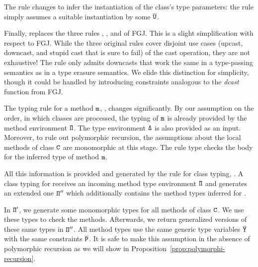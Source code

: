 The rule  changes to infer the
instantiation of the class's type parameters: the rule
simply assumes a suitable instantiation by some $\overline{\tt U}$.

Finally,  replaces the three rules
, , and 
of FGJ. This is a slight simplification with respect to FGJ. While
the three original rules cover disjoint use cases (upcast, downcast,
and stupid cast that is sure to fail) of the cast
operation, they are not exhaustive! The rule  only
admits downcasts that work the same in a type-passing semantics as in
a type erasure semantics. We elide this distinction for simplicity,
though it could be handled by introducing constraints analogous to the
\textit{dcast} function from FGJ. 



The typing rule for a method ${\tt m}$, , changes
significantly. By our assumption on the order, in which classes are
processed, the typing of ${\tt m}$ is already provided by the 
method environment ${\tt \Pi}$.  The type environment ${\tt \Delta}$ is
also provided as an input. Moreover, to rule out polymorphic
recursion, the assumptions about the local methods of class ${\tt C}$
are monomorphic at this stage. The rule type checks the body for the
inferred type of method ${\tt m}$.

All this information is provided and generated by the rule for class
typing, . A class typing for  receives an incoming
method type environment ${\tt \Pi}$ and generates an extended one
${\tt \Pi''}$ which additionally contains the method types inferred for
.

In ${\tt \Pi'}$, we generate some monomorphic types for all
methods of class ${\tt C}$. We use these types to check the methods. Afterwards, we
return generalized versions of these same types in ${\tt \Pi''}$. All
method types use the same generic type variables $\overline{\tt Y}$ with the
same constraints $\overline{\tt P}$. It is safe to make this assumption in the absence of
polymorphic recursion as we will show in
Proposition~\ref{prop:polymorphi-recursion}.



